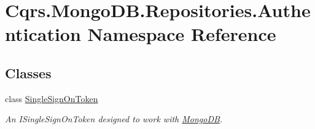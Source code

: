 \hypertarget{namespaceCqrs_1_1MongoDB_1_1Repositories_1_1Authentication}{}\section{Cqrs.\+Mongo\+D\+B.\+Repositories.\+Authentication Namespace Reference}
\label{namespaceCqrs_1_1MongoDB_1_1Repositories_1_1Authentication}
\subsection*{Classes}
\begin{DoxyCompactItemize}
\item 
class \hyperlink{classCqrs_1_1MongoDB_1_1Repositories_1_1Authentication_1_1SingleSignOnToken}{Single\+Sign\+On\+Token}
\begin{DoxyCompactList}\small\item\em An I\+Single\+Sign\+On\+Token designed to work with \hyperlink{namespaceCqrs_1_1MongoDB}{Mongo\+DB}. \end{DoxyCompactList}\end{DoxyCompactItemize}
